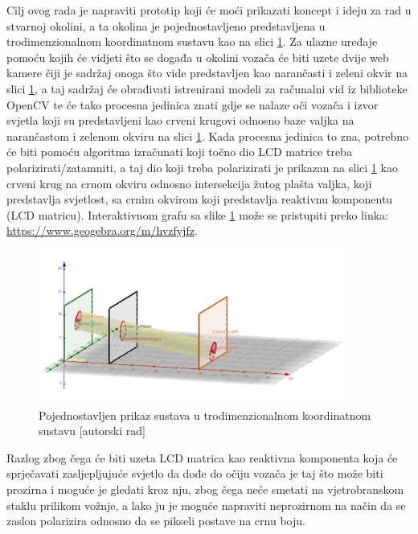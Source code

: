 \documentclass{foi}
\begin{document}
Cilj ovog rada je napraviti prototip koji će moći prikazati koncept i ideju za rad u stvarnoj okolini, a ta okolina je pojednostavljeno predstavljena u trodimenzionalnom koordinatnom sustavu kao na slici \ref{fig:prikaz_sustava_1}. Za ulazne uređaje pomoću kojih će vidjeti što se događa u okolini vozača će biti uzete dvije web kamere čiji je sadržaj onoga što vide predstavljen kao narančasti i zeleni okvir na slici \ref{fig:prikaz_sustava_1}, a taj sadržaj će obrađivati istrenirani modeli za računalni vid iz biblioteke OpenCV te će tako procesna jedinica znati gdje se nalaze oči vozača i izvor svjetla koji su predstavljeni kao crveni krugovi odnosno baze valjka na narančastom i zelenom okviru na slici \ref{fig:prikaz_sustava_1}. Kada procesna jedinica to zna, potrebno će biti pomoću algoritma izračunati koji točno dio LCD matrice treba polarizirati/zatamniti, a taj dio koji treba polarizirati je prikazan na slici \ref{fig:prikaz_sustava_1} kao crveni krug na crnom okviru odnosno intersekcija žutog plašta valjka, koji predstavlja svjetlost, sa crnim okvirom koji predstavlja reaktivnu komponentu (LCD matricu). Interaktivnom grafu sa slike \ref{fig:prikaz_sustava_1} može se pristupiti preko linka: \url{https://www.geogebra.org/m/hvzfyjfz}.

\begin{figure}[h!]
    \centering
    \includegraphics[width=0.9\textwidth]{slike/graf_uvod}
    \caption{Pojednostavljen prikaz sustava u trodimenzionalnom koordinatnom sustavu [autorski rad]}
    \label{fig:prikaz_sustava_1}
\end{figure}

Razlog zbog čega će biti uzeta LCD matrica kao reaktivna komponenta koja će sprječavati zasljepljujuće svjetlo da dođe do očiju vozača je taj što može biti prozirna i moguće je gledati kroz nju, zbog čega neće smetati na vjetrobranskom staklu prilikom vožnje, a lako ju je moguće napraviti neprozirnom na način da se zaslon polarizira odnosno da se pikseli postave na crnu boju.
\end{document}
